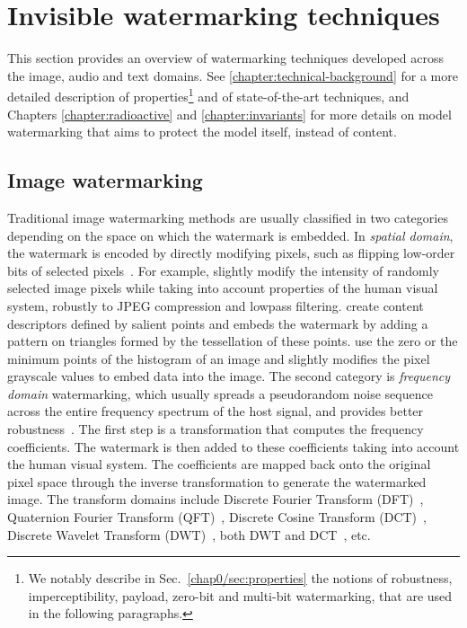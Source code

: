 \section{Invisible \gls*{watermarking} techniques}\label{chap0/sec:watermarking}

This section provides an overview of watermarking techniques developed across the image, audio and text domains.
See \autoref{chapter:technical-background} for a more detailed description of properties\footnote{
    We notably describe in Sec.~\ref{chap0/sec:properties} the notions of robustness, imperceptibility, payload, zero-bit and multi-bit watermarking, that are used in the following paragraphs.
} and of state-of-the-art techniques, and Chapters \ref{chapter:radioactive} and \ref{chapter:invariants} for more details on model watermarking that aims to protect the model itself, instead of content.

\subsection{Image watermarking}

Traditional image watermarking methods are usually classified in two categories depending on the space on which the watermark is embedded. 
In \textit{spatial domain}, the watermark is encoded by directly modifying pixels, such as flipping low-order bits of selected pixels~\citep{van1994digital}. 
For example, \cite{nikolaidis1998robust} slightly modify the intensity of randomly selected image pixels while taking into account properties of the human visual system, robustly to JPEG compression and lowpass filtering.
\cite{bas2002geometrically} create content descriptors defined by salient points and embeds the watermark by adding a pattern on triangles formed by the tessellation of these points.
\cite{ni2006reversible} use the zero or the minimum points of the histogram of an image and slightly modifies the pixel grayscale values to embed data into the image. 
The second category is \textit{frequency domain} watermarking, which usually spreads a pseudorandom noise sequence across the entire frequency spectrum of the host signal, and provides better robustness~\citep{cox1997secure}. 
The first step is a transformation that computes the frequency coefficients.
The watermark is then added to these coefficients taking into account the human visual system.
The coefficients are mapped back onto the original pixel space through the inverse transformation to generate the watermarked image. 
The transform domains include Discrete Fourier Transform (DFT)~\citep{urvoy2014perceptual}, 
Quaternion Fourier Transform (QFT)~\citep{bas2003color, ouyang2015qdft}, 
Discrete Cosine Transform (DCT)~\citep{bors1996image, piva1997dct, barni1998dct, li2011new},
Discrete Wavelet Transform (DWT)~\citep{xia1998wavelet, barni2001improved, furon2008broken}, 
both DWT and DCT~\citep{feng2010dwt, zear2018proposed}, etc.

